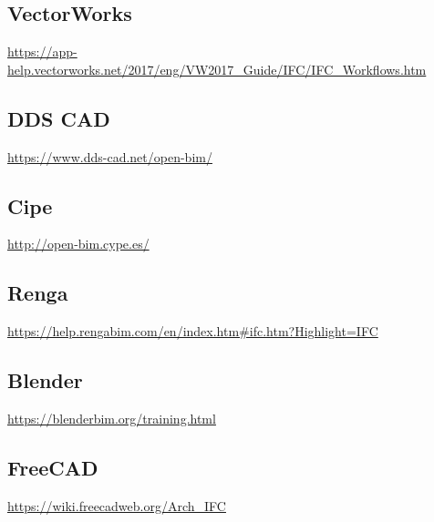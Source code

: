 \documentclass[spanish,12pt,a4paper,final,oneside]{book}
\begin{document}
\subsection{VectorWorks}
\url{https://app-help.vectorworks.net/2017/eng/VW2017_Guide/IFC/IFC_Workflows.htm}


\subsection{DDS CAD}
\url{https://www.dds-cad.net/open-bim/}


\subsection{Cipe}
\url{http://open-bim.cype.es/}


\subsection{Renga}
\url{https://help.rengabim.com/en/index.htm#ifc.htm?Highlight=IFC}


\subsection{Blender}
\url{https://blenderbim.org/training.html}


\subsection{FreeCAD}
\url{https://wiki.freecadweb.org/Arch_IFC}
\end{document}
